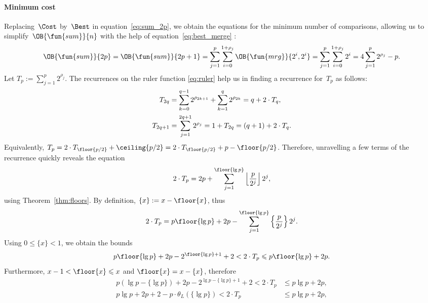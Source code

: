 \paragraph{Minimum cost}

Replacing~\(\Cost\) by~\(\Best\) in equation~\eqref{eq:sum_2p}, we
obtain the equations for the minimum number of comparisons, allowing
us to simplify~\(\OB{\fun{sum}}{n}\)
with the help of equation~\eqref{eq:best_merge}
:
\begin{equation}
\OB{\fun{sum}}{2p}
  = \OB{\fun{sum}}{2p+1}
  = \sum_{j=1}^{p}\sum_{i=0}^{1+\rho_{j}}{\OB{\fun{mrg}}{2^i,2^i}}
  = \sum_{j=1}^{p}\sum_{i=0}^{1+\rho_{j}}{2^{i}}
  = 4\sum_{j=1}^{p}{2^{\rho_{j}}} - p.
\label{eq:B_oplus}
\end{equation}
Let \(T_p := \sum_{j=1}^{p}{2^{\rho_{j}}}\). The recurrences on the
ruler function \eqref{eq:ruler}
 help us in finding a recurrence for~\(T_p\) as
follows:
\begin{align*}
T_{2q} &= \sum_{k=0}^{\smash[t]{q-1}}{2^{\rho_{2k+1}}} +
\sum_{k=1}^{q}{2^{\rho_{2k}}} = q + 2 \cdot T_{q},\\[2mm]
T_{2q+1}
&= \sum_{j=1}^{\smash[t]{2q+1}}{2^{\rho_{j}}} = 1 + T_{2q} = (q + 1) +
2 \cdot T_{q}.
\end{align*}
Equivalently, \(T_{p} = 2 \cdot T_{\floor{p/2}} + \ceiling{p/2} = 2
\cdot T_{\floor{p/2}} + p - \floor{p/2}\). Therefore, unravelling a
few terms of the recurrence quickly reveals the equation
\begin{equation*}
2 \cdot T_p = 2p + \sum_{j=1}^{\floor{\lg p}}
            {\left\lfloor{\frac{p}{2^j}}\right\rfloor 2^j},
\end{equation*}
using Theorem~\vref{thm:floors}. By definition, \(\{x\} := x -
\floor{x}\), thus
\begin{equation*}
2 \cdot T_p = p\floor{\lg p} + 2p - \sum_{j=1}^{\floor{\lg
    p}}\left\lbrace\frac{p}{2^j}\right\rbrace 2^j.
\end{equation*}
Using \(0 \leqslant \{x\} < 1\), we obtain the bounds
\begin{equation*}
p\floor{\lg p} + 2p - 2^{\floor{\lg p}+1} + 2 < 2 \cdot T_p \leqslant
p\floor{\lg p} + 2p.
\end{equation*}
Furthermore, \(x - 1 < \floor{x} \leqslant x\) and \(\floor{x} = x -
\{x\}\), therefore
\begin{align*}
p(\lg p - \{\lg p\}) + 2p - 2^{\lg p - \{\lg p\} +
  1} + 2 < 2 \cdot T_p &\leqslant p\lg p + 2p,\\
p\lg p + 2p + 2 - p \cdot \theta_L(\{\lg p\}) < 2 \cdot T_p
&\leqslant p\lg p + 2p,
\end{align*}
